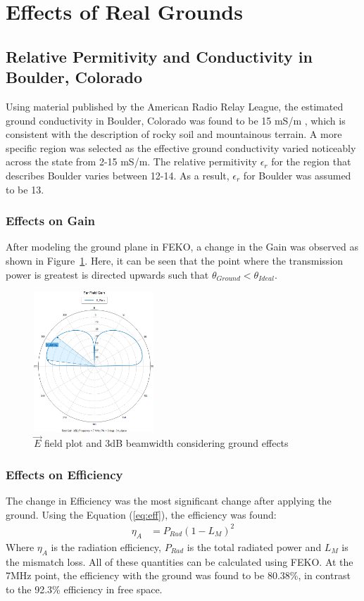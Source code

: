 \section{Effects of Real Grounds}
\subsection{Relative Permitivity and Conductivity in Boulder, Colorado}
Using material published by the American Radio Relay League, the estimated
ground conductivity in Boulder, Colorado was found to be 15 mS/m \cite{antbook}, which
is consistent with the description of rocky soil and mountainous terrain. A
more specific region was selected as the effective ground conductivity varied
noticeably across the state from 2-15 mS/m. The relative permitivity
$\epsilon_r$ for the region that describes Boulder varies between 12-14. As a
result, $\epsilon_r$ for Boulder was assumed to be 13. 

\subsubsection{Effects on Gain}
After modeling the ground plane in FEKO, a change in the Gain was observed as
shown in Figure~\ref{fig:gpol}. Here, it can be seen that the point where the
transmission power is greatest is directed upwards
such that $\theta_{Ground}<\theta_{Ideal}$.

\begin{figure}[h!]
  \centering
  \includegraphics[width=0.40\textwidth]{./img/gndgain.png}
  \caption{$\vec{E}$ field plot and 3dB beamwidth considering ground effects} 
  \label{fig:gpol}
\end{figure}

\subsubsection{Effects on Efficiency}
The change in Efficiency was the most significant change after applying the
ground.
Using the Equation (\ref{eq:eff}), the efficiency was found:
\begin{align}
  \eta_A&=P_{Rad}(1-L_M)^2\label{eq:eff}
\end{align}
Where $\eta_A$ is the radiation efficiency, $P_{Rad}$ is the total
radiated power and $L_M$ is the mismatch loss. All of these quantities can be
calculated using FEKO. At the 7MHz point, the efficiency with the ground was
found to be 80.38\%, in contrast to the 92.3\% efficiency in free space.
